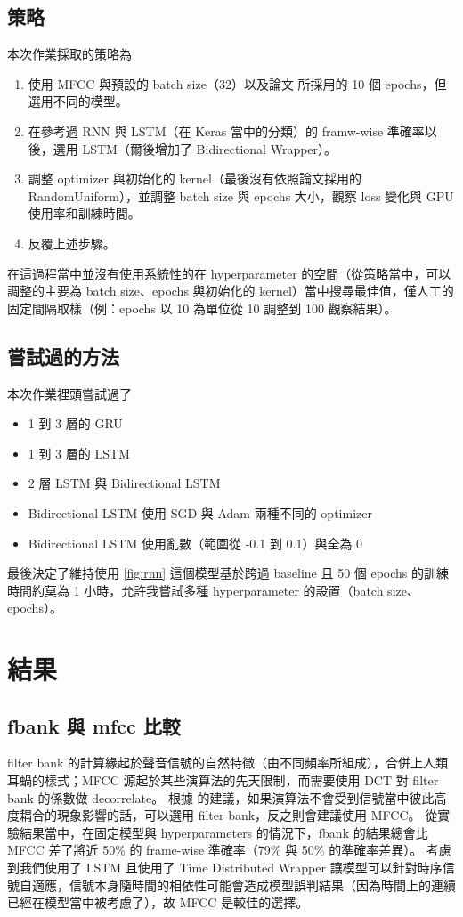 \documentclass[final,3p]{elsarticle}
\begin{document}
	\subsection{策略}
		本次作業採取的策略為
		\begin{enumerate}
			\item 使用 MFCC 與預設的 batch size（32）以及論文 \cite{Graves_2005} 所採用的 10 個 epochs，但選用不同的模型。
			\item 在參考過 RNN 與 LSTM（在 Keras 當中的分類）的 framw-wise 準確率以後，選用 LSTM（爾後增加了 Bidirectional Wrapper）。
			\item 調整 optimizer 與初始化的 kernel（最後沒有依照論文採用的 RandomUniform），並調整 batch size 與 epochs 大小，觀察 loss 變化與 GPU 使用率和訓練時間。
			\item 反覆上述步驟。 
		\end{enumerate}
		
		在這過程當中並沒有使用系統性的在 hyperparameter 的空間（從策略當中，可以調整的主要為 batch size、epochs 與初始化的 kernel）當中搜尋最佳值，僅人工的固定間隔取樣（例：epochs 以 10 為單位從 10 調整到 100 觀察結果）。
	
	\subsection{嘗試過的方法}
		本次作業裡頭嘗試過了
		\begin{itemize}
			\item 1 到 3 層的 GRU
			\item 1 到 3 層的 LSTM
			\item 2 層 LSTM 與 Bidirectional LSTM
			\item Bidirectional LSTM 使用 SGD 與 Adam 兩種不同的 optimizer
			\item Bidirectional LSTM 使用亂數（範圍從 -0.1 到 0.1）與全為 0
		\end{itemize}	
		
		最後決定了維持使用 \cref{fig:rnn} 這個模型基於跨過 baseline 且 50 個 epochs 的訓練時間約莫為 1 小時，允許我嘗試多種 hyperparameter 的設置（batch size、epochs）。
		
\section{結果}
	\subsection{fbank 與 mfcc 比較}
		filter bank 的計算緣起於聲音信號的自然特徵（由不同頻率所組成），合併上人類耳蝸的樣式；MFCC 源起於某些演算法的先天限制，而需要使用 DCT 對 filter bank 的係數做 decorrelate。
		根據 \cite{SpeechPr91:online} 的建議，如果演算法不會受到信號當中彼此高度耦合的現象影響的話，可以選用 filter bank，反之則會建議使用 MFCC。
		從實驗結果當中，在固定模型與 hyperparameters 的情況下，fbank 的結果總會比 MFCC 差了將近 50\% 的 frame-wise 準確率（79\% 與 50\% 的準確率差異）。
		考慮到我們使用了 LSTM 且使用了 Time Distributed Wrapper 讓模型可以針對時序信號自適應，信號本身隨時間的相依性可能會造成模型誤判結果（因為時間上的連續已經在模型當中被考慮了），故 MFCC 是較佳的選擇。
		
\end{document}
